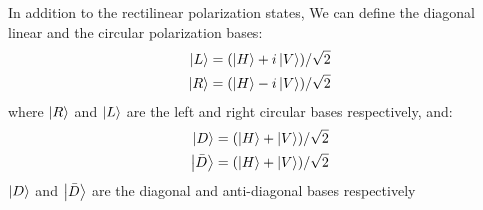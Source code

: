 	In addition to the rectilinear polarization states, We can define the diagonal linear and
	the circular polarization bases: 
	\begin{equation}
		\begin{split}
			\ket{L}=(\ket{H}+i\ket{V})/\sqrt{2} \\
			\ket{R}=(\ket{H}-i\ket{V})/\sqrt{2}
		\end{split}
	\end{equation}
	where $\ket{R}$ and $\ket{L}$ are the left and right circular bases respectively, and:
	\begin{equation}
		\begin{split}
			\ket{D}=(\ket{H}+\ket{V})/\sqrt{2}\\
			\ket{\bar{D}}=(\ket{H}+\ket{V})/\sqrt{2}
		\end{split}
	\end{equation}
	$\ket{D}$ and $\ket{\bar{D}}$ are the diagonal and anti-diagonal bases respectively
	
